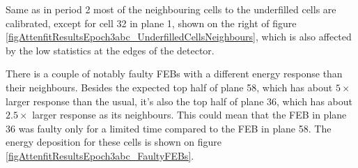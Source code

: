 \documentclass[12pt,a4paper]{article}
\begin{document}
Same as in period 2 most of the neighbouring cells to the underfilled cells are calibrated, except for cell 32 in plane 1, shown on the right of figure \ref{figAttenfitResultsEpoch3abc_UnderfilledCellsNeighbours}, which is also affected by the low statistics at the edges of the detector.

There is a couple of notably faulty FEBs with a different energy response than their neighbours. Besides the expected top half of plane 58, which has about $5\times$ larger response than the usual, it's also the top half of plane 36, which has about $2.5\times$ larger response as its neighbours. This could mean that the FEB in plane 36 was faulty only for a limited time compared to the FEB in plane 58. The energy deposition for these cells is shown on figure \ref{figAttenfitResultsEpoch3abc_FaultyFEBs}.
\end{document}
